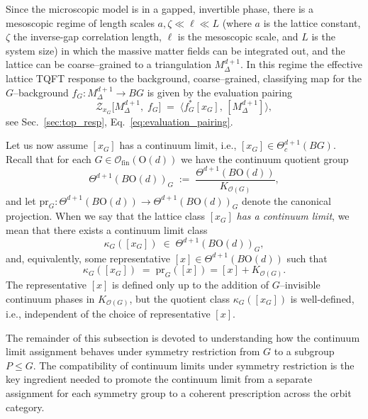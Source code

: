 \documentclass[aps,prx,reprint,superscriptaddress,twocolumn,amsmath,amssymb,amsfonts, nofootinbib]{revtex4-2}
\newcommand{\ofin}{\mathcal{O}_{\text{fin}}}
\theoremstyle{apsstyle}
\begin{document}
\bigskip 

Since the microscopic model is in a gapped, invertible phase, there is a mesoscopic regime of length scales  $a,\zeta \ll \ell \ll L$ (where $a$ is the lattice constant, $\zeta$ the inverse-gap correlation length, $\ell$ is the mesoscopic scale, and $L$ is the system size) in which the massive matter fields can be integrated out, and the lattice can be coarse–grained to a triangulation $M^{d+1}_{\Delta}$. In this regime the effective lattice TQFT response to the background, coarse–grained, classifying map for the $G$–background $f_{G} : M^{d+1}_{\Delta} \to BG$ is given by the evaluation pairing
\begin{equation*}
    \mathcal{Z}_{x_G}\bigl[M^{d+1}_{\Delta},\; f_{G}\bigr]
    \;=\;
    \big\langle f_{G}^{*}[x_G],\,[M^{d+1}_{\Delta}]\big\rangle,
\end{equation*}
see Sec.~\ref{sec:top_resp}, Eq.~\ref{eq:evaluation_pairing}.

\bigskip 

Let us now assume $[x_{G}]$ has a continuum limit, i.e., $[x_{G}]\in \Theta^{d+1}_{c}(BG)$. Recall that for each $G\in\ofin(\mathrm{O}(d))$ we have the continuum quotient group
\begin{equation*}
    \Theta^{d+1}(B\mathrm{O}(d))_{G}
    \;:=\;
    \dfrac{\Theta^{d+1}(B\mathrm{O}(d))}{K_{\mathcal{O}(G)}},
\end{equation*}
and let $\mathrm{pr}_{G}:\Theta^{d+1}(B\mathrm{O}(d))\to\Theta^{d+1}(B\mathrm{O}(d))_{G}$ denote the canonical projection. When we say that the lattice class $[x_G]$ \emph{has a continuum limit}, we mean that there exists a continuum limit class
\begin{equation*}
    \kappa_{G}([x_{G}]) \;\in\; \Theta^{d+1}(B\mathrm{O}(d))_{G},
\end{equation*}
and, equivalently, some representative $[x]\in\Theta^{d+1}(B\mathrm{O}(d))$ such that  
\begin{equation*}
    \kappa_{G}([x_{G}]) \;=\; \mathrm{pr}_{G}([x]) = [x]+K_{\mathcal{O}(G)}.
\end{equation*}
The representative $[x]$ is defined only up to the addition of $G$–invisible continuum phases in $K_{\mathcal{O}(G)}$, but the quotient class $\kappa_{G}([x_{G}])$ is  well-defined, i.e., independent of the choice of representative $[x]$. 

\medskip 

The remainder of this subsection is devoted to understanding how the continuum limit assignment behaves under symmetry restriction from $G$ to a subgroup $P\leq G$. The compatibility of continuum limits under symmetry restriction is the key ingredient needed to promote the continuum limit from a separate assignment for each symmetry group to a coherent prescription across the orbit category.
\end{document}
